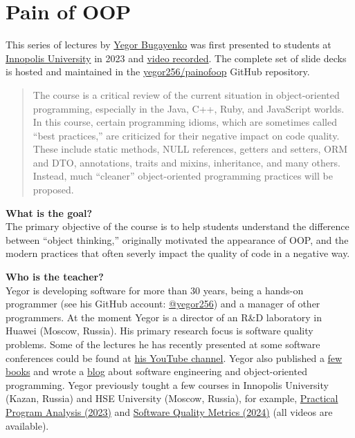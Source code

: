 \documentclass[nobrand,anonymous,nodate,nosecurity]{huawei}
\begin{document}


\section*{Pain of OOP}

This series of lectures by \href{https://www.yegor256.com}{Yegor Bugayenko}
was first presented to students at
\href{https://innopolis.university/en/}{Innopolis University} in 2023
and \href{https://www.youtube.com/playlist?list=PLaIsQH4uc08ytf8POIIAkkR4ZsRq8DFiV}{video recorded}.
The complete set of slide decks is hosted and maintained in the
\href{https://github.com/yegor256/painofoop}{yegor256/painofoop}
GitHub repository.

\begin{abstract}
The course is a critical review of the current situation in object-oriented programming,
especially in the Java, C++, Ruby, and JavaScript worlds. In this course, certain programming
idioms, which are sometimes called ``best practices,'' are criticized for their
negative impact on code quality. These include static methods, NULL references, getters
and setters, ORM and DTO, annotations, traits and mixins, inheritance, and many others.
Instead, much ``cleaner'' object-oriented programming practices will be proposed.
\end{abstract}

\textbf{What is the goal?}\\
The primary objective of the course is to help students understand the
difference between ``object thinking,'' originally motivated the
appearance of OOP, and the modern practices that often
severly impact the quality of code in a negative way.

\textbf{Who is the teacher?}\\
Yegor is developing software for more than 30 years, being a hands-on programmer
(see his GitHub account: \href{https://github.com/yegor256}{@yegor256})
and a manager of other programmers. At the moment Yegor is a director
of an R\&D laboratory in Huawei (Moscow, Russia). His primary research focus is
software quality problems. Some of the lectures he has recently presented
at some software conferences could be found at
\href{https://www.youtube.com/channel/UCr9qCdqXLm2SU0BIs6d_68Q}{his YouTube channel}.
Yegor also published a \href{https://www.yegor256.com/books.html}{few books}
and wrote a \href{https://www.yegor256.com/contents.html}{blog} about software engineering
and object-oriented programming.
Yegor previously tought a few courses in
Innopolis University (Kazan, Russia)
and HSE University (Moscow, Russia),
for example,
\href{https://github.com/yegor256/ppa}{Practical Program Analysis (2023)}
and
\href{https://github.com/yegor256/sqm}{Software Quality Metrics (2024)}
(all videos are available).
\end{document}
